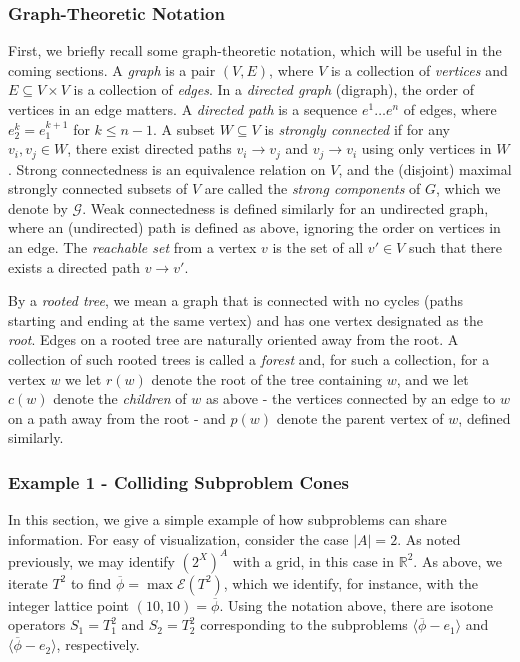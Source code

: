 \documentclass[11pt,reqno]{amsart}
\theoremstyle{definition}
\numberwithin{equation}{section}
\newcommand{\mr}{\mathbb{R}}
\newcommand{\ol}{\overline}
\newcommand{\lag}{\langle}
\newcommand{\rag}{\rangle}
\newcommand{\pre}{\phi}
\newcommand{\prealloc}{(2^X)^A}
\newcommand{\sub}{\subseteq}
\newcommand{\fix}{\mathcal{E}}
\newcommand{\toppre}{\ol{\pre}}
\newcommand{\strongc}{\mathcal{G}}
\begin{document}
\subsubsection{Graph-Theoretic Notation}
First, we briefly recall some graph-theoretic notation, which will be useful in the coming sections. A \emph{graph} is a pair $(V,E)$, where $V$ is a collection of \emph{vertices} and $E \sub V \times V$ is a collection of \emph{edges}.
In a \emph{directed graph} (digraph), the order of vertices in an edge matters. 
A \emph{directed path} is a sequence $e^1 \hdots e^n$ of edges, where $e_2^k = e_1^{k+1}$ for $k \leq n-1$. 
A subset $W \sub V$ is \emph{strongly connected} if for any $v_i, v_j \in W$, there exist directed paths $v_i \to v_j$ and $v_j \to v_i$ using only vertices in $W$. 
Strong connectedness is an equivalence relation on $V$, and the (disjoint) maximal strongly connected subsets of $V$ are called the \emph{strong components} of $G$, which we denote by $\strongc$. 
Weak connectedness is defined similarly for an undirected graph, where an (undirected) path is defined as above, ignoring the order on vertices in an edge. 
The \emph{reachable set} from a vertex $v$ is the set of all $v' \in V$ such that there exists a directed path $v \to v'$. 

By a \emph{rooted tree}, we mean a graph that is connected with no cycles (paths starting and ending at the same vertex) and has one vertex designated as the \emph{root}. 
Edges on a rooted tree are naturally oriented away from the root. 
A collection of such rooted trees is called a \emph{forest} and, for such a collection, for a vertex $w$ we let $r(w)$ denote the root of the tree containing $w$, and we let $c(w)$ denote the \emph{children} of $w$ as above - the vertices connected by an edge to $w$ on a path away from the root - and $p(w)$ denote the parent vertex of $w$, defined similarly.  

\subsubsection{Example 1 - Colliding Subproblem Cones}
In this section, we give a simple example of how subproblems can share information.
For easy of visualization, consider the case $|A| = 2$. As noted previously, we may identify $\prealloc$ with a grid, in this case in $\mr^2$.
As above, we iterate $T^2$ to find $\toppre = \max \fix(T^2)$, which we identify, for instance, with the integer lattice point $(10,10) = \toppre$. 
Using the notation above, there are isotone operators $S_1 = T_1^2$ and $S_2 = T_2^2$ corresponding to the subproblems $\lag \toppre - e_1 \rag$ and $\lag \toppre - e_2 \rag$, respectively. 
\end{document}
